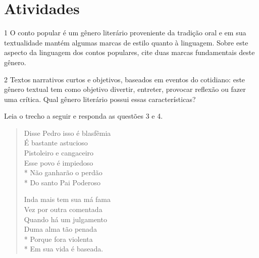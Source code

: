 \section*{Atividades}

\num{1} O conto popular é um gênero literário proveniente da tradição oral e
em sua textualidade mantém algumas marcas de estilo quanto à linguagem. Sobre
este aspecto da linguagem dos contos populares, cite duas marcas fundamentais
deste gênero.


\num{2} Textos narrativos curtos e objetivos, baseados em eventos do
cotidiano: este gênero textual tem como objetivo divertir, entreter, provocar
reflexão ou fazer uma crítica. Qual gênero literário possui essas
características?


Leia o trecho a seguir e responda as questões 3 e 4.

\begin{myquote}

\begin{verse}

Disse Pedro isso é blasfêmia \\
É bastante astucioso \\
Pistoleiro e cangaceiro \\ 
Esse povo é impiedoso \\*
Não ganharão o perdão \\*
Do santo Pai Poderoso 

Inda mais tem sua má fama \\
Vez por outra comentada \\
Quando há um julgamento \\
Duma alma tão penada \\*
Porque fora violenta \\*
Em sua vida é baseada. 

\end{verse}


\end{myquote}

